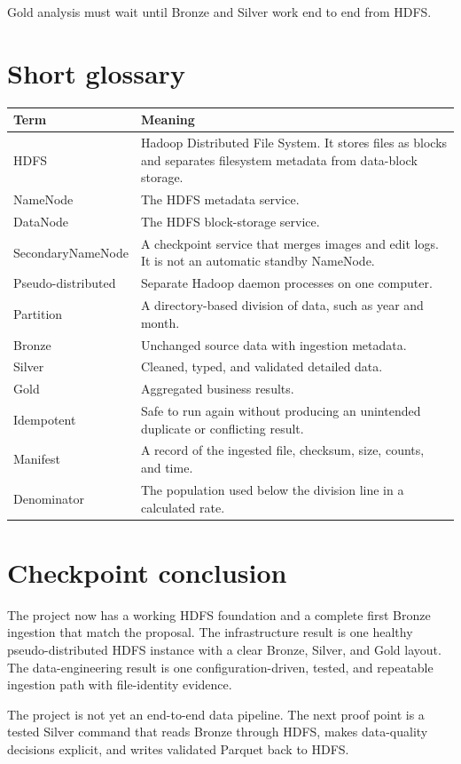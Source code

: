 \documentclass[11pt,a4paper]{article}
\begin{document}
Gold analysis must wait until Bronze and Silver work end to end from HDFS.

\section{Short glossary}

\begin{longtable}{@{}p{}p{}@{}}
\toprule
Term & Meaning \\
\midrule
\endhead
HDFS & Hadoop Distributed File System. It stores files as blocks and separates filesystem metadata from data-block storage. \\
NameNode & The HDFS metadata service. \\
DataNode & The HDFS block-storage service. \\
SecondaryNameNode & A checkpoint service that merges images and edit logs. It is not an automatic standby NameNode. \\
Pseudo-distributed & Separate Hadoop daemon processes on one computer. \\
Partition & A directory-based division of data, such as year and month. \\
Bronze & Unchanged source data with ingestion metadata. \\
Silver & Cleaned, typed, and validated detailed data. \\
Gold & Aggregated business results. \\
Idempotent & Safe to run again without producing an unintended duplicate or conflicting result. \\
Manifest & A record of the ingested file, checksum, size, counts, and time. \\
Denominator & The population used below the division line in a calculated rate. \\
\bottomrule
\end{longtable}

\section{Checkpoint conclusion}

The project now has a working HDFS foundation and a complete first Bronze ingestion that match the proposal. The infrastructure result is one healthy pseudo-distributed HDFS instance with a clear Bronze, Silver, and Gold layout. The data-engineering result is one configuration-driven, tested, and repeatable ingestion path with file-identity evidence.

The project is not yet an end-to-end data pipeline. The next proof point is a tested Silver command that reads Bronze through HDFS, makes data-quality decisions explicit, and writes validated Parquet back to HDFS.
\end{document}
